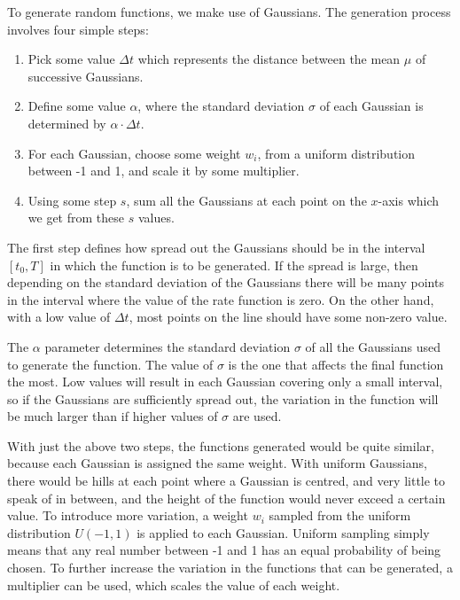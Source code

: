 \documentclass[a4paper,11pt,twoside]{article}
\begin{document}
   To generate random functions, we make use of Gaussians. The generation process
   involves four simple steps:
\begin{enumerate}
\item Pick some value $\Delta t$ which represents the distance between the mean
   $\mu$ of successive Gaussians.
\item Define some value $\alpha$, where the standard deviation $\sigma$ of each
   Gaussian is determined by $\alpha\cdot\Delta t$.
\item For each Gaussian, choose some weight $w_i$, from a uniform distribution
   between -1 and 1, and scale it by some multiplier.
\item Using some step $s$, sum all the Gaussians at each point on the $x$-axis which
   we get from these $s$ values.
\end{enumerate}

   The first step defines how spread out the Gaussians should be in the interval
   $[t_0, T]$ in which the function is to be generated. If the spread is large,
   then depending on the standard deviation of the Gaussians there will be many
   points in the interval where the value of the rate function is zero. On the
   other hand, with a low value of $\Delta t$, most points on the line should
   have some non-zero value.

   The $\alpha$ parameter determines the standard deviation $\sigma$ of all the
   Gaussians used to generate the function. The value of $\sigma$ is the one
   that affects the final function the most. Low values will result in each
   Gaussian covering only a small interval, so if the Gaussians are sufficiently
   spread out, the variation in the function will be much larger than if higher
   values of $\sigma$ are used.

   With just the above two steps, the functions generated would be quite
   similar, because each Gaussian is assigned the same weight. With uniform
   Gaussians, there would be hills at each point where a Gaussian is centred,
   and very little to speak of in between, and the height of the function would
   never exceed a certain value. To introduce more variation, a weight $w_i$
   sampled from the uniform distribution $U(-1,1)$ is applied to each
   Gaussian. Uniform sampling simply means that any real number between -1 and 1
   has an equal probability of being chosen. To further increase the variation
   in the functions that can be generated, a multiplier can be used, which
   scales the value of each weight.
\end{document}
